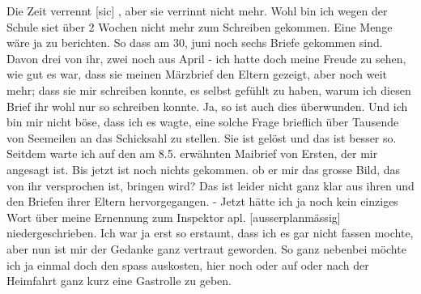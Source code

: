 \def\day{13. Juli 1943.}
\mktitle

Die Zeit verrennt{\color{red} [sic] }, aber sie verrinnt nicht mehr.
Wohl bin ich wegen der Schule siet \"{u}ber 2 Wochen nicht mehr zum Schreiben gekommen.
Eine Menge w\"{a}re ja zu berichten.
So dass am 30, juni noch sechs Briefe gekommen sind.
Davon drei von ihr, zwei noch aus April - ich hatte doch meine Freude zu sehen, wie gut es war, dass sie meinen M\"{a}rzbrief den Eltern gezeigt, aber noch weit mehr; dass sie mir schreiben konnte, es selbst gef\"{u}hlt zu haben, warum ich diesen Brief ihr wohl nur so schreiben konnte.
Ja, so ist auch dies \"{u}berwunden.
Und ich bin mir nicht b\"{o}se, dass ich es wagte, eine solche Frage brieflich \"{u}ber Tausende von Seemeilen an das Schicksahl zu stellen.
Sie ist gel\"{o}st und das ist besser so.
Seitdem warte ich auf den am 8.5. erw\"{a}hnten Maibrief von Ersten, der mir angesagt ist.
Bis jetzt ist noch nichts gekommen.
ob er mir das grosse Bild, das von ihr versprochen ist, bringen wird?
Das ist leider nicht ganz klar aus ihren und den Briefen ihrer Eltern hervorgegangen.
- Jetzt h\"{a}tte ich ja noch kein einziges Wort \"{u}ber meine Ernennung zum Inspektor apl. {\color{red} [ausserplanm\"{a}ssig] } niedergeschrieben.
Ich war ja erst so erstaunt, dass ich es gar nicht fassen mochte, aber nun ist mir der Gedanke ganz vertraut geworden.
So ganz nebenbei m\"{o}chte ich ja einmal doch den spass auskosten, hier noch oder auf oder nach der Heimfahrt ganz kurz eine Gastrolle zu geben.

\clearpage
